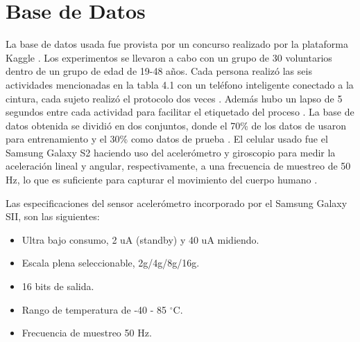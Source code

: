 \documentclass[11pt]{report}
\begin{document}
\section{Base de Datos}
\par
\medskip
\noindent
La base de datos usada fue provista por un concurso realizado por la plataforma Kaggle \cite{Kaggle}. Los experimentos se llevaron a cabo con un grupo de 30 voluntarios dentro de un grupo de edad de 19-48 años. Cada persona realizó las seis actividades mencionadas en la tabla 4.1 con un teléfono inteligente conectado a la cintura, cada sujeto realizó el protocolo dos veces \cite{Angarita}. Además hubo un lapso de 5 segundos entre cada actividad para facilitar el etiquetado del proceso \cite{Anguita}. La base de datos obtenida se dividió en dos conjuntos, donde el 70\% de los datos de usaron para entrenamiento y el 30\% como datos de prueba \cite{Angarita}. El celular usado fue el Samsung Galaxy S2 haciendo uso del acelerómetro y giroscopio para medir la aceleración lineal y angular, respectivamente, a una frecuencia de muestreo de 50 Hz, lo que es suficiente para capturar el movimiento del cuerpo humano \cite{Angarita}.

Las especificaciones del sensor acelerómetro incorporado por el Samsung Galaxy SII, son las siguientes:

\begin{itemize}
\item Ultra bajo consumo, 2 uA (standby) y 40 uA midiendo.
\item Escala plena seleccionable, 2g/4g/8g/16g.
\item 16 bits de salida.
\item Rango de temperatura de -40 - 85 $^\circ$C.
\item Frecuencia de muestreo 50 Hz.
\end{itemize}


\end{document}
